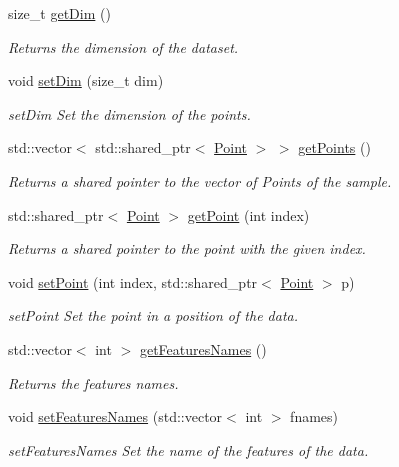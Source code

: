 \begin{DoxyCompactItemize}
size\+\_\+t \hyperlink{class_data_a7aba855040506ff3c7ce6ffb2b2773b4}{get\+Dim} ()
\begin{DoxyCompactList}\small\item\em Returns the dimension of the dataset. \end{DoxyCompactList}\item 
void \hyperlink{class_data_a940307fd855d626c6f18573b3eaf7009}{set\+Dim} (size\+\_\+t dim)
\begin{DoxyCompactList}\small\item\em set\+Dim Set the dimension of the points. \end{DoxyCompactList}\item 
std\+::vector$<$ std\+::shared\+\_\+ptr$<$ \hyperlink{class_point}{Point} $>$ $>$ \hyperlink{class_data_a9310e45321bca4335b8ab3031d343e16}{get\+Points} ()
\begin{DoxyCompactList}\small\item\em Returns a shared pointer to the vector of Points of the sample. \end{DoxyCompactList}\item 
std\+::shared\+\_\+ptr$<$ \hyperlink{class_point}{Point} $>$ \hyperlink{class_data_abd978f3708d705e972dc458b6e3fe791}{get\+Point} (int index)
\begin{DoxyCompactList}\small\item\em Returns a shared pointer to the point with the given index. \end{DoxyCompactList}\item 
void \hyperlink{class_data_ad1f5969b33170e908334bd1ad6163b54}{set\+Point} (int index, std\+::shared\+\_\+ptr$<$ \hyperlink{class_point}{Point} $>$ p)
\begin{DoxyCompactList}\small\item\em set\+Point Set the point in a position of the data. \end{DoxyCompactList}\item 
std\+::vector$<$ int $>$ \hyperlink{class_data_a2f6399baee6535e7f48250da54fbf00d}{get\+Features\+Names} ()
\begin{DoxyCompactList}\small\item\em Returns the features names. \end{DoxyCompactList}\item 
void \hyperlink{class_data_a2702b6464d7299c3b62e4eb4390fecd6}{set\+Features\+Names} (std\+::vector$<$ int $>$ fnames)
\begin{DoxyCompactList}\small\item\em set\+Features\+Names Set the name of the features of the data. \end{DoxyCompactList}\item 

\end{DoxyCompactItemize}
